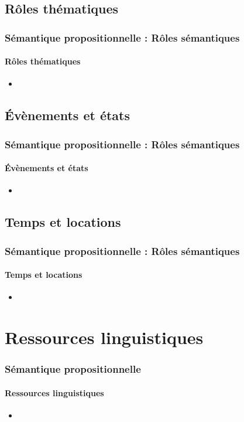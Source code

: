 \documentclass[xcolor=table]{beamer}
\begin{document}
\subsection{Rôles thématiques}

\begin{frame}
	\frametitle{Sémantique propositionnelle : Rôles sémantiques}
	\framesubtitle{Rôles thématiques}
	
	\begin{itemize}
		\item 
	\end{itemize}
	
\end{frame}

\subsection{Évènements et états}

\begin{frame}
	\frametitle{Sémantique propositionnelle : Rôles sémantiques}
	\framesubtitle{Évènements et états}
	
	\begin{itemize}
		\item 
	\end{itemize}
	
\end{frame}

\subsection{Temps et locations}

\begin{frame}
	\frametitle{Sémantique propositionnelle : Rôles sémantiques}
	\framesubtitle{Temps et locations}
	
	\begin{itemize}
		\item 
	\end{itemize}
	
\end{frame}

\section{Ressources linguistiques}

\begin{frame}
	\frametitle{Sémantique propositionnelle}
	\framesubtitle{Ressources linguistiques}
	
	\begin{itemize}
		\item 
	\end{itemize}
	
\end{frame}
\end{document}
